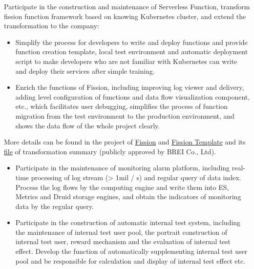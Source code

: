 \documentclass{resume}
\begin{document}
Participate in the construction and maintenance of Serverless Function, transform fission function framework based on knowing Kubernetes cluster, and extend the transformation to the company:
\begin{itemize}[topsep = 0 pt, partopsep = 0pt]
  \item Simplify the process for developers to write and deploy functions and provide function creation template, local test environment and automatic deployment script to make developers who are not familiar with Kubernetes can write and deploy their services after simple training.
  \item Enrich the functions of Fission, including improving log viewer and delivery, adding level configuration of functions and data flow visualization component, etc., which facilitates user debugging, simplifies the process of function migration from the test environment to the production environment, and shows the data flow of the whole project clearly.
\end{itemize}
More details can be found in the project of \href{https://github.com/jingtaozhang18/fission}{Fission} and \href{https://github.com/jingtaozhang18/fission-template}{Fission Template} and its \href{https://jingtao.fun/%E6%BA%90%E7%A0%81-Fission%E5%8A%9F%E8%83%BD%E6%8B%93%E5%B1%95/}{file} of transformation summary (publicly approved by BREI Co., Ltd).

\begin{itemize}[topsep = 0 pt, partopsep = 0pt]
  \item Participate in the maintenance of monitoring alarm platform, including real-time processing of log stream (> 1mil / s) and regular query of data index. Process the log flows by the computing engine and write them into ES, Metrics and Druid storage engines, and obtain the indicators of monitoring data by the regular query.
  \item Participate in the construction of automatic internal test system, including the maintenance of internal test user pool, the portrait construction of internal test user, reward mechanism and the evaluation of internal test effect. Develop the function of automatically supplementing internal test user pool and be responsible for calculation and display of internal test effect etc.
\end{itemize}
\end{document}
